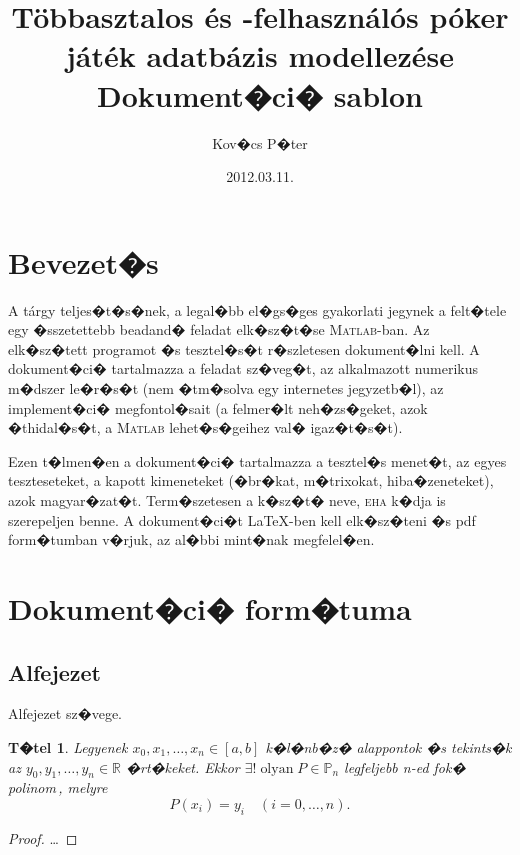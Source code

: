 \documentclass[oneside,11pt,a4paper]{article}
\title{Többasztalos és -felhasználós póker játék adatbázis modellezése\\ \vspace{3mm} \large Dokument�ci� sablon}
\author{Kov�cs P�ter}
\date{2012.03.11.}
\newtheorem{theorem}{T�tel}
\newtheorem{proof}{Bizony�t�s}
\newcommand{\IR}{\mathbb{R}}
\newcommand{\IP}{\mathbb{P}}
\begin{document}
\maketitle			



\section{Bevezet�s}

A tárgy teljes�t�s�nek, a legal�bb el�gs�ges gyakorlati jegynek a felt�tele egy �sszetettebb beadand� feladat elk�sz�t�se \textsc{Matlab}-ban. Az elk�sz�tett programot �s tesztel�s�t r�szletesen dokument�lni kell. A dokument�ci� tartalmazza a feladat sz�veg�t, az alkalmazott numerikus m�dszer le�r�s�t (nem �tm�solva egy internetes jegyzetb�l), az implement�ci� megfontol�sait (a felmer�lt neh�zs�geket, azok �thidal�s�t, a \textsc{Matlab} lehet�s�geihez val� igaz�t�s�t). \par 

	Ezen t�lmen�en a dokument�ci� tartalmazza a tesztel�s menet�t, az egyes teszteseteket, a kapott kimeneteket (�br�kat, m�trixokat, hiba�zeneteket), azok magyar�zat�t. Term�szetesen a k�sz�t� neve, \textsc{eha} k�dja is szerepeljen benne. A dokument�ci�t \LaTeX -ben kell elk�sz�teni �s pdf form�tumban v�rjuk, az al�bbi mint�nak megfelel�en.

	
\section{Dokument�ci� form�tuma}

\subsection{Alfejezet}
Alfejezet sz�vege.

\begin{theorem}
Legyenek $x_0,x_1,\ldots,x_n \in [a,b]$ k�l�nb�z� alappontok �s tekints�k az $y_0, y_1, \ldots, y_n \in \IR$ �rt�keket. Ekkor $\exists! \; \text{olyan} \; P\in \IP_n$ legfeljebb n-ed fok� polinom\,, melyre 
\[
P(x_i)=y_i \quad (i=0,\ldots,n).
\]
\end{theorem}
\begin{proof}
\ldots
\end{proof}
\end{document}
